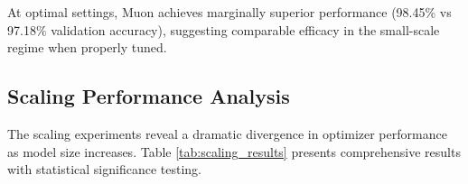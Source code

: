 \documentclass[11pt,a4paper]{article}
\begin{document}
At optimal settings, Muon achieves marginally superior performance (98.45\% vs 97.18\% validation accuracy), suggesting comparable efficacy in the small-scale regime when properly tuned.

\subsection{Scaling Performance Analysis}

The scaling experiments reveal a dramatic divergence in optimizer performance as model size increases. Table \ref{tab:scaling_results} presents comprehensive results with statistical significance testing.

\begin{table}[H]
\centering
\caption{Scaling experiment results showing mean ± standard deviation across two random seeds. Statistical significance assessed via independent t-tests.}
\label{tab:scaling_results}
\end{table}
\end{document}
